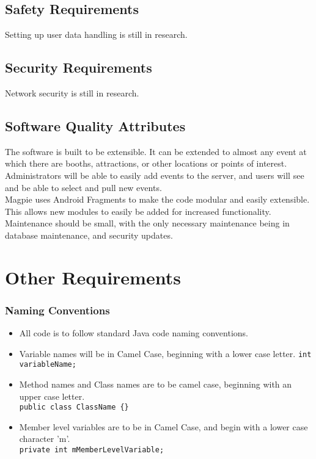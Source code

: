 \documentclass{scrreprt}
\begin{document}
\section{Safety Requirements}
Setting up user data handling is still in research.

\section{Security Requirements}
Network security is still in research.

\section{Software Quality Attributes}
The software is built to be extensible. It can be extended to almost any event at
which there are booths, attractions, or other locations or points of interest. \\
Administrators will be able to easily add events to the server, and users will see
and be able to select and pull new events. \\
Magpie uses Android Fragments to make the code modular and easily extensible.
This allows new modules to easily be added for increased functionality. \\
Maintenance should be small, with the only necessary maintenance being in
database maintenance, and security updates. \\

\chapter{Other Requirements}


\subsection{Naming Conventions}
\begin{itemize}
\item All code is to follow standard Java code naming conventions.
\item Variable names will be in Camel Case, beginning with a lower case letter.
\texttt{int variableName;}
\item Method names and Class names are to be camel case, beginning with an upper case letter. \\
\texttt{public class ClassName \{\}}
\item Member level variables are to be in Camel Case, and begin with a lower case character 'm'. \\
\texttt{private int mMemberLevelVariable;}
\end{itemize}
\end{document}
